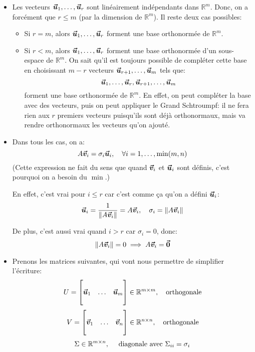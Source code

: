 \documentclass[a4paper]{article}
\begin{document}
{\begin{itemize}[left=0pt]
    Les vecteurs $\bvec{u}_1, \ldots, \bvec{u}_r$ sont orthonormés dans $\mathbb{R}^m$ car ils sont orthogonaux (on a démontré que $\left(A \bvec{v}_i\right) \dotprod \left(A \bvec{v}_j\right) = 0$ quand $i \neq j$) et car ils sont de norme égale à 1.
    \item Les vecteurs $\bvec{u}_1, \ldots, \bvec{u}_r$ sont linéairement indépendants dans $\mathbb{R}^m$. Donc, on a forcément que $r \leq m$ (par la dimension de $\mathbb{R}^m$). Il reste deux cas possibles:
        \begin{itemize}
            \item Si $r = m$, alors $\bvec{u}_1, \ldots, \bvec{u}_r$ forment une base orthonormée de $\mathbb{R}^m$.
            \item Si $r < m$, alors $\bvec{u}_1, \ldots, \bvec{u}_r$ forment une base orthonormée d'un sous-espace de $\mathbb{R}^m$. On sait qu'il est toujours possible de compléter cette base en choisissant $m - r$ vecteurs $\bm{\protect\vec{u}}_{r+1}, \ldots, \bm{\protect\vec{u}}_m$ tels que:
            \[\bm{\protect\vec{u}}_1, \ldots, \bm{\protect\vec{u}}_r, \bm{\protect\vec{u}}_{r+1}, \ldots, \bm{\protect\vec{u}}_m\]
            forment une base orthonormée de $\mathbb{R}^m$. En effet, on peut compléter la base avec des vecteurs, puis on peut appliquer le Grand Schtroumpf: il ne fera rien aux $r$ premiers vecteurs puisqu'ils sont déjà orthonormaux, mais va rendre orthonormaux les vecteurs qu'on ajouté.
        \end{itemize}

    \item Dans tous les cas, on a:
    \[A \bvec{v}_i = \sigma_i \bvec{u}_i, \mathspace \forall i = 1, \ldots, \min\left(m, n\right)\]
    (Cette expression ne fait du sens que quand $\bm{\protect\vec{v}}_i$ et $\bm{\protect\vec{u}}_i$ sont définis, c'est pourquoi on a besoin du $\min$.)

    En effet, c'est vrai pour $i \leq r$ car c'est comme ça qu'on a défini $\bm{\protect\vec{u}}_i$:
    \[\bvec{u}_i = \frac{1}{\left\|A \bvec{v}_i\right\|} = A \bvec{v}_i, \mathspace \sigma_i = \left\| A \bvec{v}_i\right\|\]

    De plus, c'est aussi vrai quand $i > r$ car $\sigma_i = 0$, donc:
    \[\left\|A \bvec{v}_i\right\| = 0 \implies A \bvec{v}_i = \bvec{0}\]


    \item Prenons les matrices suivantes, qui vont nous permettre de simplifier l'écriture:
    \[U = \begin{bmatrix}  &  &  \\ \bm{\protect\vec{u}}_1 & \ldots & \bm{\protect\vec{u}}_m \\  &  &  \end{bmatrix} \in \mathbb{R}^{m \times m}, \quad \text{orthogonale}\]
    \[V = \begin{bmatrix}  &  &  \\ \bm{\protect\vec{v}}_1 & \ldots & \bm{\protect\vec{v}}_n \\  &  &  \end{bmatrix} \in \mathbb{R}^{n \times n}, \quad \text{orthogonale}\]
    \[\Sigma \in \mathbb{R}^{m \times n}, \quad \text{ diagonale avec } \Sigma_{ii} = \sigma_i\]


\end{itemize}}
\end{document}
